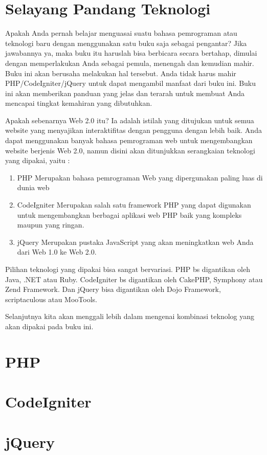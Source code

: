 \section{Selayang Pandang Teknologi}
Apakah Anda pernah belajar menguasai suatu bahasa pemrograman atau teknologi baru dengan menggunakan satu buku saja sebagai pengantar? Jika jawabannya ya, maka buku itu haruslah bisa berbicara secara bertahap, dimulai dengan memperlakukan Anda sebagai pemula, menengah dan kemudian mahir. Buku ini akan berusaha melakukan hal tersebut. Anda tidak harus mahir PHP/CodeIgniter/jQuery untuk dapat mengambil manfaat dari buku ini. Buku ini akan memberikan panduan yang jelas dan terarah untuk membuat Anda mencapai tingkat kemahiran yang dibutuhkan.

Apakah sebenarnya Web 2.0 itu? Ia adalah istilah yang ditujukan untuk semua website yang menyajikan interaktifitas dengan pengguna dengan lebih baik. Anda dapat menggunakan banyak bahasa pemrograman web untuk mengembangkan website berjenis Web 2.0, namun disini akan ditunjukkan serangkaian teknologi yang dipakai, yaitu :
\begin{enumerate}
\item PHP
  Merupakan bahasa pemrograman Web yang dipergunakan paling luas di dunia web
\item CodeIgniter
  Merupakan salah satu framework PHP yang dapat digunakan untuk mengembangkan berbagai aplikasi web PHP baik yang kompleks maupun yang ringan.
\item jQuery
  Merupakan pustaka JavaScript yang akan meningkatkan web Anda dari Web 1.0 ke Web 2.0.
\end{enumerate}

Pilihan teknologi yang dipakai bisa sangat bervariasi. PHP bs digantikan oleh Java, .NET atau Ruby. CodeIgniter bs digantikan oleh CakePHP, Symphony atau Zend Framework. Dan jQuery bisa digantikan oleh Dojo Framework, scriptaculous atau MooTools. 

Selanjutnya kita akan menggali lebih dalam mengenai kombinasi teknolog yang akan dipakai pada buku ini.
\section{PHP}
\section{CodeIgniter}
\section{jQuery}